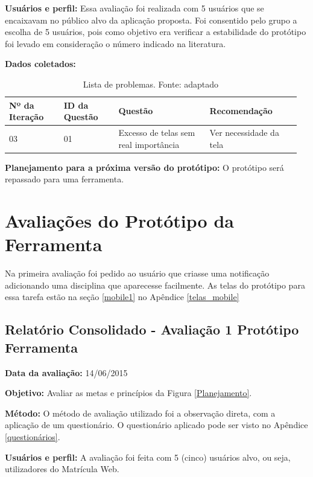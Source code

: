\textbf{Usuários e perfil:}
Essa avaliação foi realizada com 5 usuários que se encaixavam no público alvo da aplicação proposta. 
Foi consentido pelo grupo a escolha de 5 usuários, pois como objetivo era verificar a estabilidade
do protótipo foi levado em consideração o número indicado na literatura.

\textbf{Dados coletados:}

\begin{table}[!h]
\caption{Lista de problemas. Fonte: \cite{preece} adaptado}
\label{tab:problema}
  \begin{tabular}{p{0.18\linewidth}p{0.18\linewidth}p{0.30\linewidth}p{0.30\linewidth}}
  \hline
    Nº da Iteração & ID da Questão & Questão & Recomendação\\
 \hline
    03 & 01 & Excesso de telas sem real importância & Ver necessidade da tela\\
  \end{tabular}
\end{table}

\textbf{Planejamento para a próxima versão do protótipo:}
O protótipo será repassado para uma ferramenta.

\vfill
\pagebreak

\section{Avaliações do Protótipo da Ferramenta}

Na primeira avaliação foi pedido ao usuário que criasse uma notificação adicionando uma disciplina que aparecesse facilmente. As telas do protótipo para essa tarefa
estão na seção \ref{mobile1} no Apêndice \ref{telas_mobile}

  \subsection{Relatório Consolidado - Avaliação 1 Protótipo Ferramenta}

  \flushleft \textbf{Data da avaliação:} 
  14/06/2015

  \textbf{Objetivo:}
  Avaliar as metas e princípios da Figura \ref{Planejamento}.

  \textbf{Método:}
  O método de avaliação utilizado foi a observação direta, com a aplicação de um questionário. O questionário aplicado pode ser visto no 
  Apêndice \ref{questionários}.

  \textbf{Usuários e perfil:}
  A avaliação foi feita com 5 (cinco) usuários alvo, ou seja, utilizadores do Matrícula Web.
  
